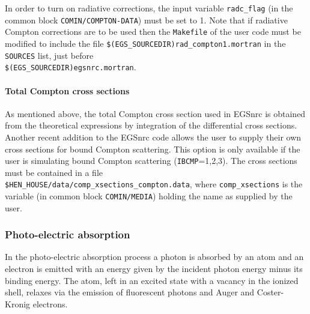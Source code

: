 In order to turn on radiative corrections, the input variable
{\tt radc\_flag} (in the common block
{\tt COMIN/COMPTON-DATA}) must be set to 1.
Note that if radiative 
Compton corrections
are to be used then the {\tt Makefile} of the user code must
be modified to include the file {\tt \$(EGS\_SOURCEDIR)rad\_compton1.mortran}
in the {\tt SOURCES} list, just before\\
 {\tt \$(EGS\_SOURCEDIR)egsnrc.mortran}.

\paragraph{Total Compton cross sections}\hfill
\label{comp_xsect}

As mentioned above, the total Compton cross section used in EGSnrc is obtained 
from the theoretical expressions by integration of the differential cross sections. 
Another recent addition to the EGSnrc code allows the user to supply their
own cross sections for bound Compton scattering. This option is only available
if the user is simulating bound Compton scattering 
({\tt IBCMP}=1,2,3).  The cross sections
must be contained in a file\\
 {\tt \$HEN\_HOUSE/data/comp\_xsections\_compton.data},
where {\tt comp\_xsections} is the variable 
(in common block {\tt COMIN/MEDIA}) holding the name as supplied
by the user.

\subsubsection{Photo-electric absorption}
\setcounter{equation}{0}
\label{photo}

In the photo-electric absorption process a photon is 
absorbed by an atom and an electron 
is emitted with an energy given by the incident photon 
energy minus its binding energy. 
The atom, left in an excited state with a vacancy in the 
ionized shell, relaxes via the emission of fluorescent photons and 
Auger and Coster-Kronig electrons.  

